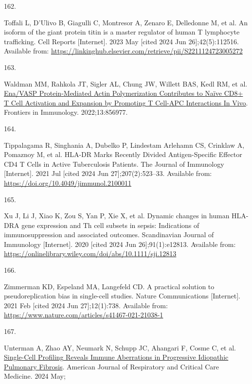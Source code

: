 \documentclass[
]{article}
\newlength{\cslhangindent}
\newlength{\csllabelwidth}
\newenvironment{CSLReferences}[2] %
 {\begin{list}{}{%
  \setlength{\itemindent}{0pt}
  \setlength{\leftmargin}{0pt}
  \setlength{\parsep}{0pt}
  \ifodd #1
   \setlength{\leftmargin}{\cslhangindent}
   \setlength{\itemindent}{-1\cslhangindent}
  \fi
  \setlength{\itemsep}{#2\baselineskip}}}
 {\end{list}}
\newcommand{\CSLLeftMargin}[1]{\parbox[t]{\csllabelwidth}{\strut#1\strut}}
\newcommand{\CSLRightInline}[1]{\parbox[t]{\linewidth - \csllabelwidth}{\strut#1\strut}}
\begin{document}
\begin{CSLReferences}{0}{1}
\CSLLeftMargin{162. }%
\CSLRightInline{Toffali L, D'Ulivo B, Giagulli C, Montresor A, Zenaro E, Delledonne M, et al. An isoform of the giant protein titin is a master regulator of human {T} lymphocyte trafficking. Cell Reports {[}Internet{]}. 2023 May {[}cited 2024 Jun 26{]};42(5):112516. Available from: \url{https://linkinghub.elsevier.com/retrieve/pii/S2211124723005272}}

\CSLLeftMargin{163. }%
\CSLRightInline{Waldman MM, Rahkola JT, Sigler AL, Chung JW, Willett BAS, Kedl RM, et al. \href{https://doi.org/10.3389/fimmu.2022.856977}{Ena/{VASP} {Protein}-{Mediated} {Actin} {Polymerization} {Contributes} to {Naïve} {CD8}+ {T} {Cell} {Activation} and {Expansion} by {Promoting} {T} {Cell}-{APC} {Interactions} {In} {Vivo}}. Frontiers in Immunology. 2022;13:856977. }

\CSLLeftMargin{164. }%
\CSLRightInline{Tippalagama R, Singhania A, Dubelko P, Lindestam Arlehamn CS, Crinklaw A, Pomaznoy M, et al. {HLA}-{DR} {Marks} {Recently} {Divided} {Antigen}-{Specific} {Effector} {CD4} {T} {Cells} in {Active} {Tuberculosis} {Patients}. The Journal of Immunology {[}Internet{]}. 2021 Jul {[}cited 2024 Jun 27{]};207(2):523--33. Available from: \url{https://doi.org/10.4049/jimmunol.2100011}}

\CSLLeftMargin{165. }%
\CSLRightInline{Xu J, Li J, Xiao K, Zou S, Yan P, Xie X, et al. Dynamic changes in human {HLA}-{DRA} gene expression and {Th} cell subsets in sepsis: {Indications} of immunosuppression and associated outcomes. Scandinavian Journal of Immunology {[}Internet{]}. 2020 {[}cited 2024 Jun 26{]};91(1):e12813. Available from: \url{https://onlinelibrary.wiley.com/doi/abs/10.1111/sji.12813}}

\CSLLeftMargin{166. }%
\CSLRightInline{Zimmerman KD, Espeland MA, Langefeld CD. A practical solution to pseudoreplication bias in single-cell studies. Nature Communications {[}Internet{]}. 2021 Feb {[}cited 2024 Jun 27{]};12(1):738. Available from: \url{https://www.nature.com/articles/s41467-021-21038-1}}

\CSLLeftMargin{167. }%
\CSLRightInline{Unterman A, Zhao AY, Neumark N, Schupp JC, Ahangari F, Cosme C, et al. \href{https://doi.org/10.1164/rccm.202306-0979OC}{Single-{Cell} {Profiling} {Reveals} {Immune} {Aberrations} in {Progressive} {Idiopathic} {Pulmonary} {Fibrosis}}. American Journal of Respiratory and Critical Care Medicine. 2024 May; }


\end{CSLReferences}
\end{document}
